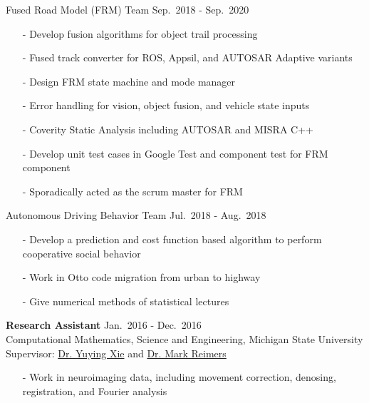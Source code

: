 \documentclass[a4paper,10pt,dvipdfmx]{article}
\begin{document}
\indent Fused Road Model (FRM) Team \hfill Sep.~2018 - Sep.~2020
\begin{itemize}[noitemsep,nolistsep,leftmargin=12mm]
  \item[-] Develop fusion algorithms for object trail processing
  \item[-] Fused track converter for ROS, Appsil, and AUTOSAR Adaptive variants
  \item[-] Design FRM state machine and mode manager
  \item[-] Error handling for vision, object fusion, and vehicle state inputs
  \item[-] Coverity Static Analysis including AUTOSAR and MISRA C++
  \item[-] Develop unit test cases in Google Test and component test for FRM component
  \item[-] Sporadically acted as the scrum master for FRM
\end{itemize}

\indent Autonomous Driving Behavior Team \hfill Jul.~2018 - Aug.~2018
\begin{itemize}[noitemsep,nolistsep,leftmargin=12mm]
  \item[-] Develop a prediction and cost function based algorithm to perform cooperative social behavior
  \item[-] Work in Otto code migration from urban to highway
  \item[-] Give numerical methods of statistical lectures\\
\end{itemize}

\indent \textbf{Research Assistant} \hfill Jan.~2016 - Dec.~2016\\
\indent Computational Mathematics, Science and Engineering, Michigan State University\\
\indent Supervisor: \href{https://cmse.msu.edu/directory/faculty/yuying-xie/}{Dr. Yuying Xie} and \href{https://msu.edu/~reimersm/}{Dr. Mark Reimers}
\begin{itemize}[noitemsep,nolistsep,leftmargin=12mm]
  \item[-] Work in neuroimaging data, including movement correction, denosing, registration, and Fourier analysis\\
\end{itemize}
\end{document}
